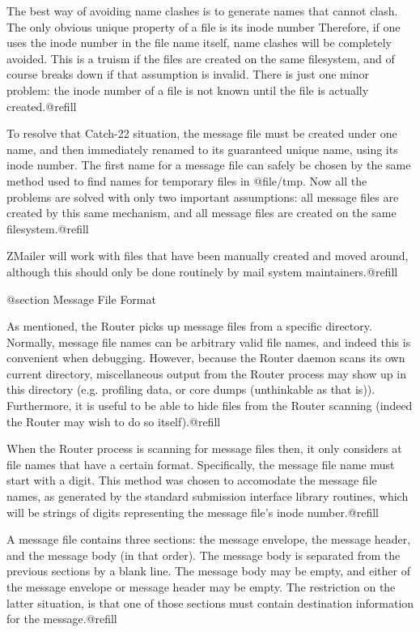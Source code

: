 The best way of avoiding name clashes is to generate names that cannot
clash.  The only obvious unique property of a file is its inode number
Therefore, if one uses the inode number in the file name itself, name
clashes will be completely avoided.  This is a truism if the files are
created on the same filesystem, and of course breaks down if that
assumption is invalid.  There is just one minor problem: the inode
number of a file is not known until the file is actually
created.@refill

To resolve that Catch-22 situation, the message file must be created
under one name, and then immediately renamed to its guaranteed unique
name, using its inode number.  The first name for a message file can
safely be chosen by the same method used to find names for temporary
files in @file{/tmp}.  Now all the problems are solved with only two
important assumptions: all message files are created by this same
mechanism, and all message files are created on the same filesystem.@refill

ZMailer will work with files that have been manually created and moved
around, although this should only be done routinely by mail system
maintainers.@refill

@section Message File Format

As mentioned, the Router picks up message files from a specific
directory.  Normally, message file names can be arbitrary valid file
names, and indeed this is convenient when debugging.  However, because
the Router daemon scans its own current directory, miscellaneous output
from the Router process may show up in this directory (e.g. profiling
data, or core dumps (unthinkable as that is)).  Furthermore, it is
useful to be able to hide files from the Router scanning (indeed the
Router may wish to do so itself).@refill

When the Router process is scanning for message files then, it only
considers at file names that have a certain format.  Specifically, the
message file name must start with a digit.  This method was chosen to
accomodate the message file names, as generated by the standard
submission interface library routines, which will be strings of digits
representing the message file's inode number.@refill

A message file contains three sections: the message envelope, the
message header, and the message body (in that order).  The message body
is separated from the previous sections by a blank line.  The message
body may be empty, and either of the message envelope or message header
may be empty.  The restriction on the latter situation, is that one of
those sections must contain destination information for the
message.@refill

